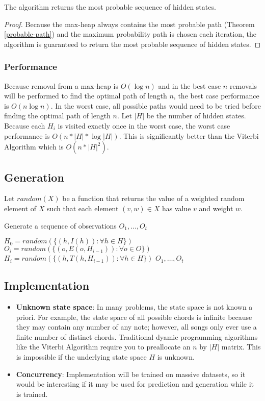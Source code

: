 \documentclass[../main.tex]{subfiles}
\begin{document}
\begin{theorem}
The algorithm returns the most probable sequence of hidden states.
\end{theorem}
\begin{proof}
Because the max-heap always contains the most probable path (Theorem \ref{probable-path}) and the maximum probability path is chosen each iteration, the algorithm is guaranteed to return the most probable sequence of hidden states.
\end{proof}

\subsubsection{Performance}
Because removal from a max-heap is $O(\log n)$ and in the best case $n$ removals will be performed to find the optimal path of length $n$, the best case performance is $O(n \log n)$. In the worst case, all possible paths would need to be tried before finding the optimal path of length $n$. Let $|H|$ be the number of hidden states. Because each $H_i$ is visited exactly once in the worst case, the worst case performance is $O(n * |H| * \log |H|)$. This is significantly better than the Viterbi Algorithm which is $O(n * |H|^2)$.

\subsection{Generation}
Let $random(X)$ be a function that returns the value of a weighted random element of $X$ such that each element $(v, w) \in X$ has value $v$ and weight $w$.

\begin{algorithm}[H]
\caption{Generate a sequence of observations $O_1, \ldots, O_t$}
\label{hmm-predict}
\begin{algorithmic}
    \State $H_0 = random(\{(h, I(h)): \forall h \in H\})$
        \State $O_i = random(\{(o, E(o, H_{i-1})): \forall o \in O\})$
        \State $H_i = random(\{(h, T(h, H_{i-1})): \forall h \in H\})$
    \EndFor
    \State\Return $O_1, \ldots, O_t$
\EndFunction
\end{algorithmic}
\end{algorithm}

\subsection{Implementation}
\begin{itemize}
    \item \textbf{Unknown state space}: In many problems, the state space is not known a priori. For example, the state space of all possible chords is infinite because they may contain any number of any note; however, all songs  only ever use a finite number of distinct chords. Traditional dyamic programming algorithms like the Viterbi Algorithm require you to preallocate an $n$ by $|H|$ matrix. This is impossible if the underlying state space $H$ is unknown.
    \item \textbf{Concurrency}: Implementation will be trained on massive datasets, so it would be interesting if it may be used for prediction and generation while it is trained.
\end{itemize}
\end{document}
